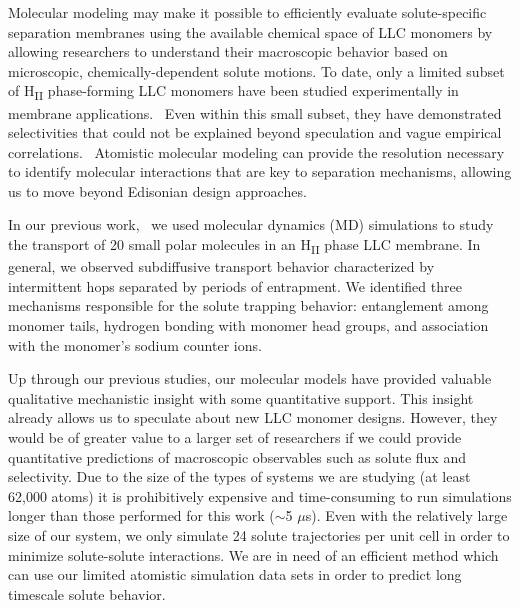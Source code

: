 \documentclass[journal=ancac3,manuscript=article,layout=twocolumn]{achemso}
\begin{document}
  Molecular modeling may make it possible to efficiently evaluate solute-specific
  separation membranes using the available chemical space of LLC monomers by 
  allowing researchers to understand their macroscopic behavior based on 
  microscopic, chemically-dependent solute motions. To date, only a limited 
  subset of H\textsubscript{II} phase-forming LLC monomers have been studied
  experimentally in membrane applications.~\cite{carter_glycerol-based_2012,hatakeyama_nanoporous_2010,smith_ordered_1997,zhou_assembly_2003,resel_structural_2000}
  Even within this small subset, they have demonstrated selectivities that
  could not be explained beyond speculation and vague empirical
  correlations.~\cite{dischinger_application_2017} Atomistic molecular modeling
  can provide the resolution necessary to identify molecular interactions that
  are key to separation mechanisms, allowing us to move beyond Edisonian design
  approaches.

  In our previous work,~\cite{coscia_chemically_2019} we used molecular
  dynamics (MD) simulations to study the transport of 20 small polar molecules
  in an H\textsubscript{II} phase LLC membrane. 
  In general,
  we observed subdiffusive transport behavior characterized by intermittent
  hops separated by periods of entrapment. We identified three mechanisms
  responsible for the solute trapping behavior: entanglement among monomer
  tails, hydrogen bonding with monomer head groups, and association with the
  monomer's sodium counter ions.
  
  Up through our previous studies, our molecular models have provided valuable
  qualitative mechanistic insight with some quantitative support. This insight
  already allows us to speculate about new LLC monomer designs. However, they
  would be of greater value to a larger set of researchers if we could provide
  quantitative predictions of macroscopic observables such as solute flux and
  selectivity. Due to the size of the types of systems we are studying (at
  least 62,000 atoms) it is prohibitively expensive and time-consuming to run
  simulations longer than those performed for this work ($\sim$5 $\mu$s). Even
  with the relatively large size of our system, we only simulate 24 solute
  trajectories per unit cell in order to minimize solute-solute interactions.
  We are in need of an efficient method which can use our limited atomistic 
  simulation data sets in order to predict long timescale solute behavior.  
\end{document}
